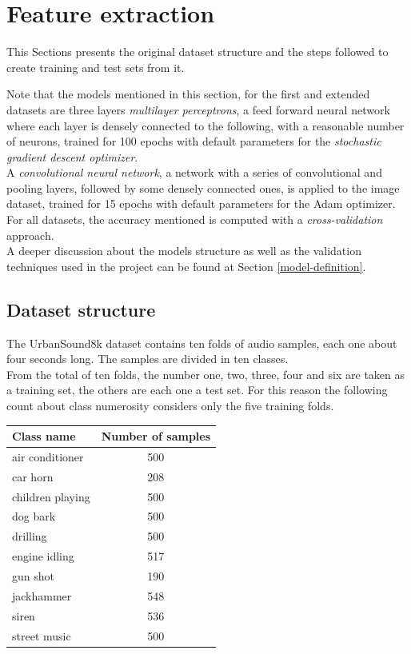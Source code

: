 \section{Feature extraction}
\label{feature-extraction}

This Sections presents the original dataset structure and the 
steps followed to create training and test sets from it.

Note that the models mentioned in this section, for the first and 
extended datasets are
three layers \emph{multilayer perceptrons}, 
a feed forward neural network where each layer 
is densely connected  to the following, 
with a reasonable number of neurons, trained 
for 100 epochs with default parameters for the \emph{stochastic gradient 
descent optimizer}.~\cite{mlp}\cite{sgd}\\
A \emph{convolutional neural network}, a network with 
a series of convolutional and pooling layers, followed by 
some densely connected ones, is applied to the image dataset, trained for 15 epochs
with default parameters for the Adam optimizer.~\cite{cnn} \\
For all datasets, the accuracy mentioned is computed with a \emph{cross-validation} 
approach.~\cite{cross}\\

A deeper discussion about the models structure as well as the validation
techniques used in the project can be found at Section \vref{model-definition}.

\subsection{Dataset structure}
\label{dataset-structure}

The UrbanSound8k dataset contains ten folds of audio samples, each one about 
four seconds long. The samples are divided in ten classes.\\
From the total of ten folds, the number one, two, three, four and six 
are taken as a training set, the others are each one a test set.
For this reason the following count about class numerosity considers
only the five training folds.

\begin{center}
    \begin{tabular}{ |l|c| } 
        \hline
        Class name & Number of samples \\
        \hline
        air conditioner & 500 \\
        car horn & 208 \\
        children playing & 500 \\
        dog bark & 500 \\
        drilling & 500 \\
        engine idling & 517 \\
        gun shot & 190 \\
        jackhammer & 548 \\
        siren & 536 \\
        street music & 500 \\
        \hline
    \end{tabular}
\end{center}

